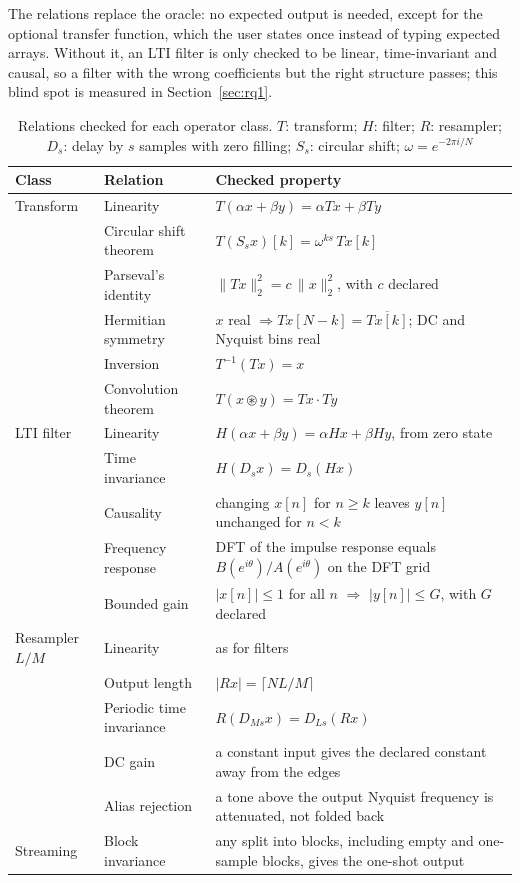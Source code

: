 \documentclass[10pt,conference]{IEEEtran}
\begin{document}
The relations replace the oracle: no expected output is needed, except for the
optional transfer function, which the user states once instead of typing
expected arrays. Without it, an LTI filter is only checked to be linear,
time-invariant and causal, so a filter with the wrong coefficients but the
right structure passes; this blind spot is measured in Section~\ref{sec:rq1}.

\begin{table}[t]
\caption{Relations checked for each operator class. $T$: transform; $H$: filter; $R$: resampler; $D_s$: delay by $s$ samples with zero filling; $S_s$: circular shift; $\omega=e^{-2\pi i/N}$}
\label{tab:relations}
\centering\footnotesize
\renewcommand{\arraystretch}{1.15}
\begin{tabular}{@{}lll@{}}
\toprule
Class & Relation & Checked property \\
\midrule
Transform & Linearity & $T(\alpha x+\beta y)=\alpha Tx+\beta Ty$ \\
 & Circular shift theorem & $T(S_s x)[k]=\omega^{ks}\,Tx[k]$ \\
 & Parseval's identity & $\|Tx\|_2^2=c\,\|x\|_2^2$, with $c$ declared \\
 & Hermitian symmetry & $x$ real $\Rightarrow Tx[N-k]=\overline{Tx[k]}$; DC and Nyquist bins real \\
 & Inversion & $T^{-1}(Tx)=x$ \\
 & Convolution theorem & $T(x\circledast y)=Tx\cdot Ty$ \\
\midrule
LTI filter & Linearity & $H(\alpha x+\beta y)=\alpha Hx+\beta Hy$, from zero state \\
 & Time invariance & $H(D_s x)=D_s(Hx)$ \\
 & Causality & changing $x[n]$ for $n\ge k$ leaves $y[n]$ unchanged for $n<k$ \\
 & Frequency response & DFT of the impulse response equals $B(e^{i\theta})/A(e^{i\theta})$ on the DFT grid \\
 & Bounded gain & $|x[n]|\le1$ for all $n$ $\Rightarrow$ $|y[n]|\le G$, with $G$ declared \\
\midrule
Resampler $L/M$ & Linearity & as for filters \\
 & Output length & $|Rx|=\lceil NL/M\rceil$ \\
 & Periodic time invariance & $R(D_{Ms}x)=D_{Ls}(Rx)$ \\
 & DC gain & a constant input gives the declared constant away from the edges \\
 & Alias rejection & a tone above the output Nyquist frequency is attenuated, not folded back \\
\midrule
Streaming & Block invariance & any split into blocks, including empty and one-sample blocks, gives the one-shot output \\
\bottomrule
\end{tabular}
\end{table}
\end{document}
